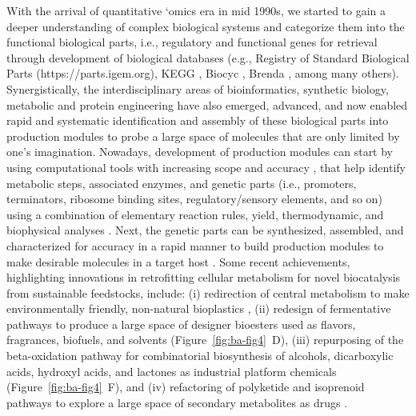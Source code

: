 With the arrival of quantitative `omics era in mid 1990s, we started to gain a deeper understanding of complex biological systems and categorize them into the functional biological parts, i.e., regulatory and functional genes for retrieval through development of biological databases (e.g., Registry of Standard Biological Parts (https://parts.igem.org), KEGG \citep{kanehisa2000}, Biocyc \citep{caspi2013}, Brenda \citep{scheer2010}, among many others).
Synergistically, the interdisciplinary areas of bioinformatics, synthetic biology, metabolic and protein engineering have also emerged, advanced, and now enabled rapid and systematic identification and assembly of these biological parts into production modules to probe a large space of molecules that are only limited by one's imagination.
Nowadays, development of production modules can start by using computational tools with increasing scope and accuracy \citep{kumar2018, wang2017}, that help identify metabolic steps, associated enzymes, and genetic parts (i.e., promoters, terminators, ribosome binding sites, regulatory/sensory elements, and so on) using a combination of elementary reaction rules, yield, thermodynamic, and biophysical analyses \citep{dugar2011, kumar2018}.
Next, the genetic parts can be synthesized, assembled, and characterized for accuracy in a rapid manner to build production modules to make desirable molecules in a target host \citep{annaluru2014, bitinaite2007, blake2010, chen2013, colloms2014, gibson2009, kok2014, li2005, li2007, shao2009, trubitsyna2014, tsuge2003, zhang2012b}.
Some recent achievements, highlighting innovations in retrofitting cellular metabolism for novel biocatalysis from sustainable feedstocks, include: (i) redirection of central metabolism to make environmentally friendly, non-natural bioplastics \citep{rehm2010}, (ii) redesign of fermentative pathways to produce a large space of designer bioesters used as flavors, fragrances, biofuels, and solvents \citep{layton2014, rodriguez2014} (Figure~\ref{fig:ba-fig4}~D), (iii) repurposing of the beta-oxidation pathway for combinatorial biosynthesis of alcohols, dicarboxylic acids, hydroxyl acids, and lactones as industrial platform chemicals \citep{cheong2016} (Figure~\ref{fig:ba-fig4}~F), and (iv) refactoring of polyketide and isoprenoid pathways to explore a large space of secondary metabolites as drugs \citep{ajikumar2010, galanie2015, martin2003}.

